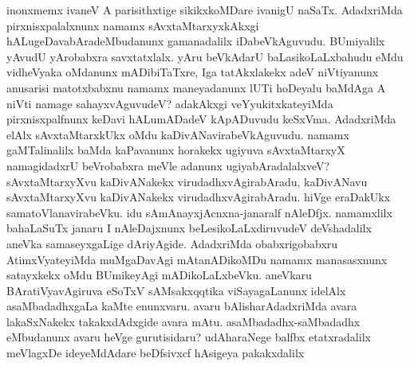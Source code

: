inonxmemx ivaneV A parisithxtige sikikxkoMDare ivanigU naSaTx. AdadxriMda pirxnisxpalalxnunx namamx sAvxtaMtarxyxkAkxgi hALugeDavabAradeMbudanunx gamanadalilx iDabeVkAguvudu. BUmiyalilx yAvudU yArobabxra savxtatxlalx. yAru beVkAdarU baLasikoLaLxbahudu eMdu vidheVyaka oMdanunx mADibiTaTxre, Iga tatAkxlakekx adeV niVtiyanunx anusarisi matotxbabxnu namamx maneyadanunx lUTi hoDeyalu baMdAga A niVti namage sahayxvAguvudeV? adakAkxgi veYyukitxkateyiMda pirxnisxpalfnunx keDavi hALumADadeV kApADuvudu keSxVma. AdadxriMda elAlx sAvxtaMtarxkUkx oMdu kaDivANavirabeVkAguvudu. \hbox{namamx} gaMTalinalilx baMda kaPavanunx horakekx ugiyuva sAvxtaMtarxyX namagidadxrU beVrobabxra meVle adanunx ugiyabAradalalxveV? sAvxtaMtarxyXvu kaDivANakekx virudadhxvAgirabAradu, kaDivANavu sAvxtaMtarxyXvu kaDivANakekx virudadhxvAgirabAradu. hiVge eraDakUkx samatoVlanavirabeVku. idu sAmAnayxjAcnxna-janaralf nAleDfjx. namamxlilx bahaLaSuTx janaru I nAleDajxnunx beLesikoLaLxdiruvudeV deVshadalilx aneVka samaseyxgaLige dAriyAgide. AdadxriMda obabxrigobabxru AtimxVyateyiMda muMgaDavAgi mAtanADikoMDu namamx manasasxnunx satayxkekx oMdu BUmikeyAgi mADikoLaLxbeVku. aneVkaru BAratiVyavAgiruva eSoTxV sAMsakxqqtika viSayagaLanunx idelAlx asaMbadadhxgaLa kaMte enunxvaru. avaru bAlisharAdadxriMda avara lakaSxNakekx takakxdAdxgide avara mAtu. asaMbadadhx-saMbadadhx eMbudanunx avaru heVge gurutisidaru? udAharaNege balfbx etatxradalilx meVlagxDe ideyeMdAdare beDfsivxcf hAsigeya pakakxdalilx 
